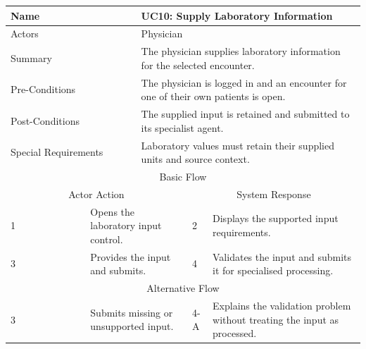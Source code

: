 \begin{reporttable}
\centering
\small
\caption{UC10: Supply Laboratory Information.}
\label{tab:kashaf:uc10}
\begin{tabular}{|p{}|p{}|p{}|p{}|p{}|}
\hline
\multicolumn{2}{|p{\dimexpr0.225\textwidth+2\tabcolsep+\arrayrulewidth\relax}|}{Name} & \multicolumn{3}{p{\dimexpr0.575\textwidth+4\tabcolsep+2\arrayrulewidth\relax}|}{UC10: Supply Laboratory Information} \\ \hline
\multicolumn{2}{|p{\dimexpr0.225\textwidth+2\tabcolsep+\arrayrulewidth\relax}|}{Actors} & \multicolumn{3}{p{\dimexpr0.575\textwidth+4\tabcolsep+2\arrayrulewidth\relax}|}{Physician} \\ \hline
\multicolumn{2}{|p{\dimexpr0.225\textwidth+2\tabcolsep+\arrayrulewidth\relax}|}{Summary} & \multicolumn{3}{p{\dimexpr0.575\textwidth+4\tabcolsep+2\arrayrulewidth\relax}|}{The physician supplies laboratory information for the selected encounter.} \\ \hline
\multicolumn{2}{|p{\dimexpr0.225\textwidth+2\tabcolsep+\arrayrulewidth\relax}|}{Pre-Conditions} & \multicolumn{3}{p{\dimexpr0.575\textwidth+4\tabcolsep+2\arrayrulewidth\relax}|}{The physician is logged in and an encounter for one of their own patients is open.} \\ \hline
\multicolumn{2}{|p{\dimexpr0.225\textwidth+2\tabcolsep+\arrayrulewidth\relax}|}{Post-Conditions} & \multicolumn{3}{p{\dimexpr0.575\textwidth+4\tabcolsep+2\arrayrulewidth\relax}|}{The supplied input is retained and submitted to its specialist agent.} \\ \hline
\multicolumn{2}{|p{\dimexpr0.225\textwidth+2\tabcolsep+\arrayrulewidth\relax}|}{Special Requirements} & \multicolumn{3}{p{\dimexpr0.575\textwidth+4\tabcolsep+2\arrayrulewidth\relax}|}{Laboratory values must retain their supplied units and source context.} \\ \hline
\multicolumn{5}{|c|}{Basic Flow} \\ \hline
\multicolumn{3}{|c|}{Actor Action} & \multicolumn{2}{c|}{System Response} \\ \hline
1 & \multicolumn{2}{p{\dimexpr0.37\textwidth+2\tabcolsep+\arrayrulewidth\relax}|}{Opens the laboratory input control.} & 2 & Displays the supported input requirements. \\ \hline
3 & \multicolumn{2}{p{\dimexpr0.37\textwidth+2\tabcolsep+\arrayrulewidth\relax}|}{Provides the input and submits.} & 4 & Validates the input and submits it for specialised processing. \\ \hline
\multicolumn{5}{|c|}{Alternative Flow} \\ \hline
3 & \multicolumn{2}{p{\dimexpr0.37\textwidth+2\tabcolsep+\arrayrulewidth\relax}|}{Submits missing or unsupported input.} & 4-A & Explains the validation problem without treating the input as processed. \\ \hline
\end{tabular}
\end{reporttable}

